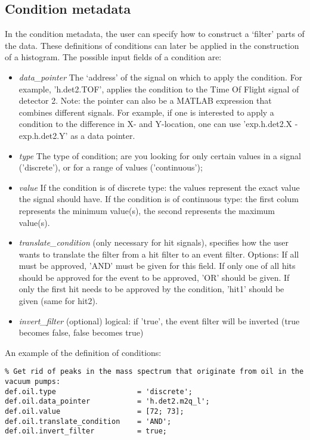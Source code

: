 \subsection{Condition metadata} \label{sec:cond}
In the condition metadata, the user can specify how to construct a `filter' parts of the data. These definitions of conditions can later be applied in the construction of a histogram. The possible input fields of a condition are:
\begin{itemize}
\item \textit{data\_pointer} The `address' of the signal on which to apply the condition. For example, 'h.det2.TOF', applies the condition to the Time Of Flight signal of detector 2. Note: the pointer can also be a MATLAB expression that combines different signals. For example, if one is interested to apply a condition to the difference in X- and Y-location, one can use 'exp.h.det2.X - exp.h.det2.Y' as a data pointer.
\item \textit{type} The type of condition; are you looking for only certain values in a signal ('discrete'), or for a range of values ('continuous');
\item \textit{value} If the condition is of discrete type: the values represent the exact value the signal should have. If the condition is of continuous type: the first colum represents the minimum value(s), the second represents the maximum value(s).
\item \textit{translate\_condition} (only necessary for hit signals), specifies how the user wants to translate the filter from a hit filter to an event filter. Options: If all must be approved, 'AND' must be given for this field. If only one of all hits should be approved for the event to be approved, 'OR' should be given.	If only the first hit needs to be approved by the condition, 'hit1' should be given (same for hit2).
\item \textit{invert\_filter} (optional) logical: if 'true', the event filter will be inverted (true becomes false, false becomes true)
\end{itemize}

An example of the definition of conditions:

\begin{lstlisting}
% Get rid of peaks in the mass spectrum that originate from oil in the vacuum pumps:
def.oil.type                   = 'discrete';
def.oil.data_pointer           = 'h.det2.m2q_l';
def.oil.value                  = [72; 73];
def.oil.translate_condition    = 'AND';
def.oil.invert_filter          = true;
\end{lstlisting}


